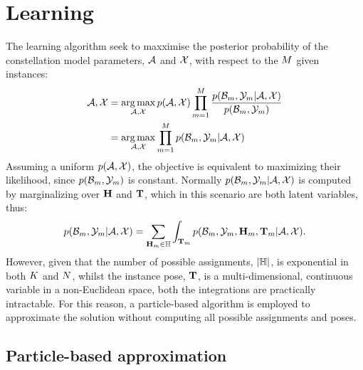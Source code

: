 \section{Learning}
The learning algorithm seek to maxximise the posterior probability of the constellation model parameters, $\mathcal{A}$ and $\mathcal{X}$, with respect to the $M$ given instances:  
\begin{equation}
	\begin{aligned}
		\mathcal{A},\mathcal{X} & = \operatorname*{arg\,max}_{\mathcal{A}, \mathcal{X}}
		p(\mathcal{A},\mathcal{X})
		\prod_{m=1}^M 
		\frac{p(\mathcal{B}_m,\mathcal{Y}_m|\mathcal{A},\mathcal{X})}{p(\mathcal{B}_m,\mathcal{Y}_m)} \\ 
		& = \operatorname*{arg\,max}_{\mathcal{A}, \mathcal{X}}
		\prod_{m=1}^M 
		p(\mathcal{B}_m,\mathcal{Y}_m|\mathcal{A},\mathcal{X}) 
	\end{aligned}
\end{equation}
Assuming a uniform $p(\mathcal{A},\mathcal{X})$, the objective is equivalent to maximizing their likelihood, since $p(\mathcal{B}_m,\mathcal{Y}_m)$ is constant.  
Normally $p(\mathcal{B}_m, \mathcal{Y}_m | \mathcal{A}, \mathcal{X})$ is computed by marginalizing over $\mathbf{H}$ and $\mathbf{T}$, which in this scenario are both latent variables, thus:
\begin{equation}
	p(\mathcal{B}_m,\mathcal{Y}_m|\mathcal{A},\mathcal{X}) = 
	\sum_{\mathbf{H}_m \in \mathbb{H}}
	\displaystyle\int_{\mathbf{T}_m}
	p(\mathcal{B}_m,\mathcal{Y}_m,\mathbf{H}_m,\mathbf{T}_m|\mathcal{A},\mathcal{X}).
	\label{eq/reg/learningobjective}
\end{equation}
However, given that the number of possible assignments, $|\mathbb{H}|$, is exponential in both $K$ and $N$, whilst the instance pose, $\mathbf{T}$, is a multi-dimensional, continuous variable in a non-Euclidean space, both the integrations are practically intractable. For this reason, a particle-based algorithm is employed to approximate the solution without computing all possible assignments and poses.  

\def\spfparticlem{\particle_{\anyinstance}  =  \anyparticle}
\def\spfparticle{\particle  =  \anyparticle} 
\subsection{Particle-based approximation}


